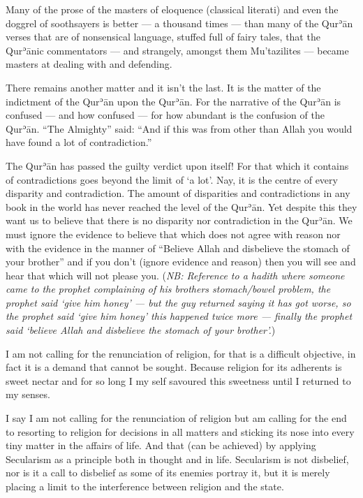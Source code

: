 \documentclass[12pt]{book}
\def \Quran{Qurʾān} %
\def \Qrn{\Quran}   %
\def \Quranic{\Quran{}ic}
\newcommand{\NB}[1]{\emph{NB: #1}}
\begin{document}
Many of the prose of the masters of eloquence (classical literati) and even the
doggrel of soothsayers is better — a thousand times — than many of the \Quran
verses that are of nonsensical language, stuffed full of fairy tales, that the
\Quranic{} commentators — and strangely, amongst them Mu’tazilites — became
masters at dealing with and defending.

There remains another matter and it isn’t the last. It is the matter of the
indictment of the \Qrn{} upon the \Quran. For the narrative of the \Qrn{} is
confused — and how confused — for how abundant is the confusion of the \Quran.
“The Almighty” said: “And if this was from other than Allah you would have
found a lot of contradiction.”

The \Qrn{} has passed the guilty verdict upon itself! For that which it
contains of contradictions goes beyond the limit of ‘a lot’. Nay, it is the
centre of every disparity and contradiction. The amount of disparities and
contradictions in any book in the world has never reached the level of the
\Quran. Yet despite this they want us to believe that there is no disparity nor
contradiction in the \Quran. We must ignore the evidence to believe that which
does not agree with reason nor with the evidence in the manner of “Believe
Allah and disbelieve the stomach of your brother”
and if you don’t (ignore evidence and reason) then you will see and hear that
which will not please you.
(\NB{Reference to a hadith where someone came to the prophet complaining of his
brothers stomach/bowel problem, the prophet said ‘give him honey’ — but the guy
returned saying it has got worse, so the prophet said ‘give him honey’ this
happened twice more — finally the prophet said ‘believe Allah and disbelieve
the stomach of your brother’.})

I am not calling for the renunciation of religion, for that is a difficult
objective, in fact it is a demand that cannot be sought. Because religion for
its adherents is sweet nectar and for so long I my self savoured this sweetness
until I returned to my senses.

I say I am not calling for the renunciation of religion but am calling for the
end to resorting to religion for decisions in all matters and sticking its nose
into every tiny matter in the affairs of life. And that (can be achieved) by
applying Secularism as a principle both in thought and in life. Secularism is
not disbelief, nor is it a call to disbelief as some of its enemies portray
it, but it is merely placing a limit to the interference between religion and
the state.
\end{document}
